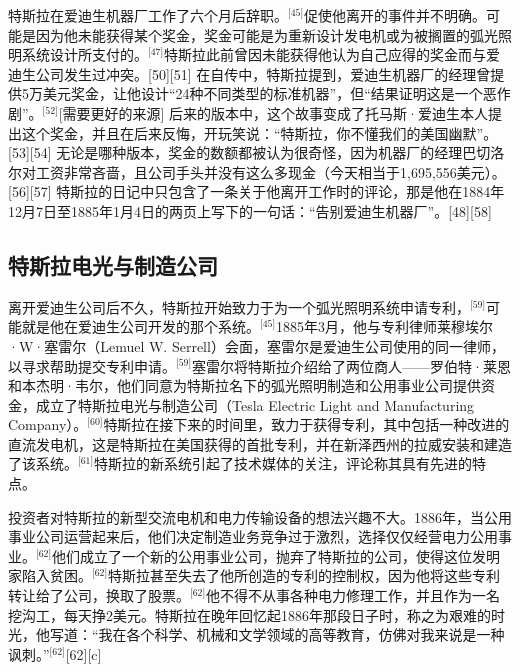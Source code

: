 特斯拉在爱迪生机器厂工作了六个月后辞职。\(^\text{[45]}\)促使他离开的事件并不明确。可能是因为他未能获得某个奖金，奖金可能是为重新设计发电机或为被搁置的弧光照明系统设计所支付的。\(^\text{[47]}\)特斯拉此前曾因未能获得他认为自己应得的奖金而与爱迪生公司发生过冲突。[50][51] 在自传中，特斯拉提到，爱迪生机器厂的经理曾提供5万美元奖金，让他设计“24种不同类型的标准机器”，但“结果证明这是一个恶作剧”。\(^\text{[52]}\)[需要更好的来源] 后来的版本中，这个故事变成了托马斯·爱迪生本人提出这个奖金，并且在后来反悔，开玩笑说：“特斯拉，你不懂我们的美国幽默”。[53][54] 无论是哪种版本，奖金的数额都被认为很奇怪，因为机器厂的经理巴切洛尔对工资非常吝啬，且公司手头并没有这么多现金（今天相当于1,695,556美元）。[56][57] 特斯拉的日记中只包含了一条关于他离开工作时的评论，那是他在1884年12月7日至1885年1月4日的两页上写下的一句话：“告别爱迪生机器厂”。[48][58]
\subsection{特斯拉电光与制造公司}  
离开爱迪生公司后不久，特斯拉开始致力于为一个弧光照明系统申请专利，\(^\text{[59]}\)可能就是他在爱迪生公司开发的那个系统。\(^\text{[45]}\)1885年3月，他与专利律师莱穆埃尔·W·塞雷尔（Lemuel W. Serrell）会面，塞雷尔是爱迪生公司使用的同一律师，以寻求帮助提交专利申请。\(^\text{[59]}\)塞雷尔将特斯拉介绍给了两位商人——罗伯特·莱恩和本杰明·韦尔，他们同意为特斯拉名下的弧光照明制造和公用事业公司提供资金，成立了特斯拉电光与制造公司（Tesla Electric Light and Manufacturing Company）。\(^\text{[60]}\)特斯拉在接下来的时间里，致力于获得专利，其中包括一种改进的直流发电机，这是特斯拉在美国获得的首批专利，并在新泽西州的拉威安装和建造了该系统。\(^\text{[61]}\)特斯拉的新系统引起了技术媒体的关注，评论称其具有先进的特点。

投资者对特斯拉的新型交流电机和电力传输设备的想法兴趣不大。1886年，当公用事业公司运营起来后，他们决定制造业务竞争过于激烈，选择仅仅经营电力公用事业。\(^\text{[62]}\)他们成立了一个新的公用事业公司，抛弃了特斯拉的公司，使得这位发明家陷入贫困。\(^\text{[62]}\)特斯拉甚至失去了他所创造的专利的控制权，因为他将这些专利转让给了公司，换取了股票。\(^\text{[62]}\)他不得不从事各种电力修理工作，并且作为一名挖沟工，每天挣2美元。特斯拉在晚年回忆起1886年那段日子时，称之为艰难的时光，他写道：“我在各个科学、机械和文学领域的高等教育，仿佛对我来说是一种讽刺。”\(^\text{[62]}\)[62][c]
